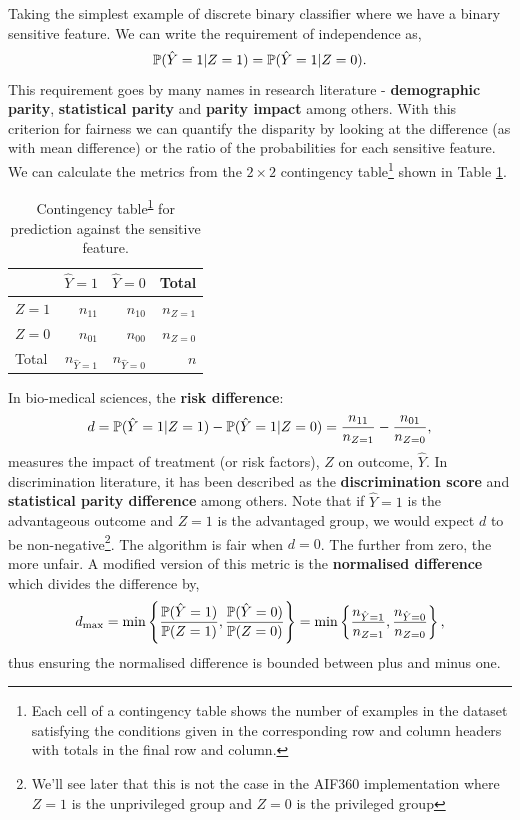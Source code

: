 Taking the simplest example of discrete binary classifier where we have a binary sensitive feature. We can write the requirement of independence as,
\[
\mathbb{P}(\hat{Y}=1 | Z=1) = \mathbb{P}(\hat{Y}=1 | Z=0).
\]
This requirement goes by many names in research literature - \textbf{demographic parity}, \textbf{statistical parity} and \textbf{parity impact} among others. With this criterion for fairness we can quantify the disparity by looking at the difference (as with mean difference) or the ratio of the probabilities for each sensitive feature. We can calculate the metrics from the $2 \times 2$ contingency table\footnote{Each cell of a contingency table shows the number of examples in the dataset satisfying the conditions given in the corresponding row and column headers with totals in the final row and column.\label{fnt_ConTab2}} shown in Table \ref{tab_independence}.
%
\begin{table}[h!]
\centering
\caption[Contingency table for prediction against the sensitive feature.]{Contingency table\textsuperscript{\ref{fnt_ConTab2}} for prediction against the sensitive feature.}
\label{tab_independence}
\vspace{10pt}
\begin{tabular}{|l|r|r|r|}
\hline
      & $\hat{Y}=1$     & $\hat{Y}=0$     & Total     \\
\hline
\hline
$Z=1$ & $n_{11}$        & $n_{10}$        & $n_{Z=1}$ \\
$Z=0$ & $n_{01}$        & $n_{00}$        & $n_{Z=0}$ \\
\hline
\hline
Total & $n_{\hat{Y}=1}$ & $n_{\hat{Y}=0}$ & $n$       \\
\hline
\end{tabular}
\end{table}
%
In bio-medical sciences, the \textbf{risk difference}:
\[
d = \mathbb{P}(\hat{Y}=1 | Z=1) - \mathbb{P}(\hat{Y}=1 | Z=0)
  = \frac{n_{11}}{n_{Z=1}} - \frac{n_{01}}{n_{Z=0}},
\]
measures the impact of treatment (or risk factors), $Z$ on outcome, $\hat{Y}$. In discrimination literature, it has been described as the \textbf{discrimination score} and \textbf{statistical parity difference} among others. Note that if $\hat{Y}=1$ is the advantageous outcome and $Z=1$ is the advantaged group, we would expect $d$ to be non-negative\footnote{We'll see later that this is not the case in the AIF360 implementation where $Z=1$ is the unprivileged group and $Z=0$ is the privileged group}. The algorithm is fair when $d=0$. The further from zero, the more unfair. A modified version of this metric is the \textbf{normalised difference}\cite{Zliobaite} which  divides the difference by,
\begin{equation} \label{eqn_dmax}
d_{\max} = \min\left\{ \frac{\mathbb{P}(\hat{Y}=1)}{\mathbb{P}(Z=1)},
                       \frac{\mathbb{P}(\hat{Y}=0)}{\mathbb{P}(Z=0)} \right\}
= \min\left\{ \frac{n_{\hat{Y}=1}}{n_{Z=1}},
              \frac{n_{\hat{Y}=0}}{n_{Z=0}} \right\},
\end{equation}
thus ensuring the normalised difference is bounded between plus and minus one.

